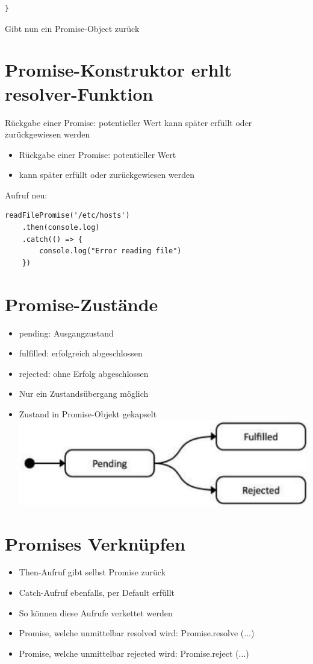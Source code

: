 \documentclass[10pt]{article}
\begin{document}
\begin{verbatim}
}
\end{verbatim}

Gibt nun ein Promise-Object zurück

\section*{Promise-Konstruktor erhlt resolver-Funktion}
Rückgabe einer Promise: potentieller Wert kann später erfüllt oder zurückgewiesen werden

\begin{itemize}
  \item Rückgabe einer Promise: potentieller Wert
  \item kann später erfüllt oder zurückgewiesen werden
\end{itemize}

Aufruf neu:

\begin{verbatim}
readFilePromise('/etc/hosts')
    .then(console.log)
    .catch(() => {
        console.log("Error reading file")
    })
\end{verbatim}

\section*{Promise-Zustände}
\begin{itemize}
  \item pending: Ausgangzustand
  \item fulfilled: erfolgreich abgeschlossen
  \item rejected: ohne Erfolg abgeschlossen
  \item Nur ein Zustandsübergang möglich
  \item Zustand in Promise-Objekt gekapselt\\
\includegraphics[width=\linewidth]{images/2024_12_29_858f09cde51177c71657g-14}
\end{itemize}

\section*{Promises Verknüpfen}
\begin{itemize}
  \item Then-Aufruf gibt selbst Promise zurück
  \item Catch-Aufruf ebenfalls, per Default erfüllt
  \item So können diese Aufrufe verkettet werden
  \item Promise, welche unmittelbar resolved wird: Promise.resolve (...)
  \item Promise, welche unmittelbar rejected wird: Promise.reject (...)
\end{itemize}
\end{document}
